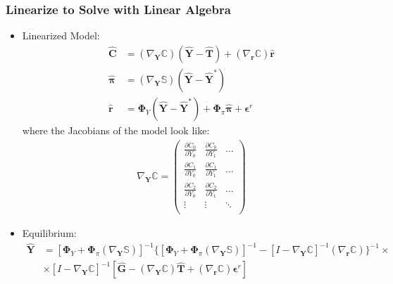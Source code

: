 \documentclass[english,xcolor=svgnames]{beamer}
\begin{document}
\begin{frame}
    \frametitle{Linearize to Solve with Linear Algebra}
    \begin{itemize}
        \item Linearized Model:
        \begin{align*}
            \bm{\hat{C}} &= (\nabla_{\bm{Y}}\pmb{\mathbb{C}}) (\bm{\hat{Y}} - \bm{\hat{T}}) + (\nabla_{\bm{r}}\pmb{\mathbb{C}})\bm{\hat{r}} \\
            \bm{\hat{\pi}} &= (\nabla_{\bm{Y}}\pmb{\mathbb{S}})(\bm{\hat{Y}} - \bm{\hat{Y}}^*)  \\
            \bm{\hat{r}} &= \bm{\Phi}_Y (\bm{\hat{Y}} - \bm{\hat{Y}}^*) +  \bm{\Phi}_\pi \bm{\hat{\pi}} + \bm{\epsilon}^r 
        \end{align*}
        where the Jacobians of the model look like:
        \begin{align*}
            \nabla_{\bm{Y}}\pmb{\mathbb{C}} = 
            \begin{pmatrix}
                \frac{\partial C_{0}}{\partial Y_0} & \frac{\partial C_{0}}{\partial Y_1} & \hdots \\
                \frac{\partial C_{1}}{\partial Y_0} & \frac{\partial C_{1}}{\partial Y_1} & \hdots \\
                \frac{\partial C_{2}}{\partial Y_0} & \frac{\partial C_{2}}{\partial Y_1} & \hdots \\
                \vdots & \vdots & \ddots \\
            \end{pmatrix}
        \end{align*}
        \item Equilibrium:
         \begin{align*}
             \bm{\hat{Y}} &=  [ \bm{\Phi}_Y  +  \bm{\Phi}_\pi (\nabla_{\bm{Y}}\pmb{\mathbb{S}}) ]^{-1} \{[ \bm{\Phi}_Y  +  \bm{\Phi}_\pi (\nabla_{\bm{Y}}\pmb{\mathbb{S}}) ]^{-1} - [I - \nabla_{\bm{Y}}\pmb{\mathbb{C}}]^{-1}(\nabla_{\bm{r}}\pmb{\mathbb{C}})  \}^{-1}  \times\\ 
             &\times[I - \nabla_{\bm{Y}}\pmb{\mathbb{C}}]^{-1} [\bm{\hat{G}} - (\nabla_{\bm{Y}}\pmb{\mathbb{C}})\bm{\hat{T}} + (\nabla_{\bm{r}}\pmb{\mathbb{C}})\bm{\epsilon}^r ]  
         \end{align*}
    \end{itemize}
\end{frame}
\end{document}
